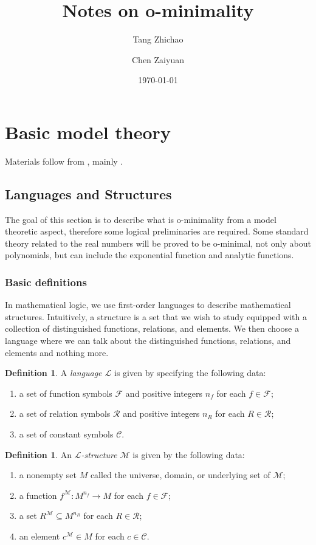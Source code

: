 \documentclass{amsart}
\title{Notes on o-minimality}
\author{Tang Zhichao}
\author{Chen Zaiyuan}
\date{\today}
\theoremstyle{definition}
\newtheorem{definition}[theorem]{Definition}
\numberwithin{equation}{section}
\begin{document}
\maketitle

\tableofcontents

\section{Basic model theory}
Materials follow from \cite{zbMATH01821671,zbMATH01160037},
mainly \cite{zbMATH01821671}.
\subsection{Languages and Structures}
The goal of this section is to describe what is o-minimality
from a model theoretic aspect,
therefore some logical preliminaries are required.
Some standard theory related to the real numbers
will be proved to be o-minimal,
not only about polynomials, but can include the exponential function and analytic functions.

\subsubsection{Basic definitions}
In mathematical logic,
we use first-order languages to describe mathematical structures.
Intuitively, a structure is a set that we wish to study equipped with a collection of distinguished functions, relations, and elements.
We then choose a language where we can talk about the distinguished functions, relations, and elements and nothing more.

\begin{definition}
	A \emph{language $\mathcal{L}$} is given by specifying the following data:
	\begin{enumerate}[label = {(\roman*)}]
		\item a set of function symbols $\mathcal{F}$ and positive integers $n_f$ for each $f \in \mathcal{F}$;
		\item a set of relation symbols $\mathcal{R}$ and positive integers $n_R$ for each $R \in \mathcal{R}$;
		\item a set of constant symbols $\mathcal{C}$.
	\end{enumerate}
\end{definition}

\begin{definition}
	An \emph{$\mathcal{L}$-structure $\mathcal{M}$} is given by the following data:
	\begin{enumerate}[label = {(\roman*)}]
		\item a nonempty set $M$ called the universe, domain, or underlying set of $\mathcal{M}$;
		\item a function $f^{\mathcal{M}} : M^{n_f} \to M$ for each $f \in \mathcal{F}$;
		\item a set $R^{\mathcal{M}} \subseteq M^{n_R}$ for each $R \in \mathcal{R}$;
		\item an element $c^{\mathcal{M}} \in M$ for each $c \in \mathcal{C}$.
	\end{enumerate}
\end{definition}
\end{document}
